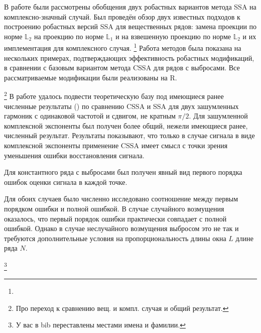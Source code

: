 \documentclass[specialist,
               substylefile = spbu.rtx,
               subf,href,colorlinks=true, 12pt]{disser}
\begin{document}


\conclusion
В работе были рассмотрены обобщения двух робастных вариантов метода SSA на комплексно-значный случай.
Был проведён обзор двух известных подходов к построению робастных версий SSA для вещественных рядов: замена проекции по норме $\mathbb{L}_2$ на проекцию по норме $\mathbb{L}_1$ и на взвешенную проекцию по норме $\mathbb{L}_2$ и их имплементация для комплексного случая.
\footnote{}
Работа методов была показана на нескольких примерах, подтверждающих эффективность робастных модификаций, в сравнении с базовым вариантом метода CSSA для рядов с выбросами. Все рассматриваемые модификации были реализованы на R.

\footnote{Про переход к сравнению вещ. и компл. случая и общий результат.}
В работе удалось подвести теоретическую базу под имеющиеся ранее численные результаты (\cite{Golyandina.etal2013}) по сравнению CSSA и SSA для двух зашумленных гармоник с одинаковой частотой и сдвигом, не кратным $\pi/2$. Для зашумленной комплексной экспоненты был получен более общий, нежели имеющиеся ранее, численный результат.
Результаты показывают, что только в случае сигнала в виде комплексной экспоненты применение CSSA имеет смысл с точки зрения уменьшения ошибки восстановления сигнала.

Для константного ряда с выбросами был получен явный вид первого порядка ошибок оценки сигнала в каждой точке.

Для обоих случаев было численно исследовано соотношение между первым порядком ошибки и полной ошибкой.
В случае случайного возмущения оказалось, что первый порядок ошибки практически совпадает с полной ошибкой. Однако в случае неслучайного возмущения выбросом это не так и требуются дополнительные условия на пропорциональность длины окна $L$ длине ряда $N$.

\footnote{У вас в bib переставлены местами имена и фамилии.}



\end{document}
